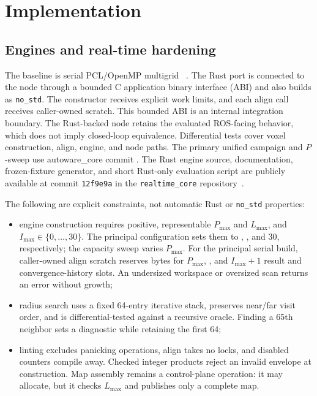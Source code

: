 \section{Implementation}
\label{sec:implementation}

\subsection{Engines and real-time hardening}
The baseline is serial PCL/OpenMP multigrid \ndt{}~\cite{autoware,autowarecore,ndtomp}. The Rust port
is connected to the node through a bounded C application binary interface (ABI) and also
builds as \texttt{no\_std}. The constructor receives explicit work limits, and each align
call receives caller-owned scratch. This bounded ABI is an internal integration boundary.
The Rust-backed node retains the evaluated ROS-facing behavior, which does not imply
closed-loop equivalence. Differential tests cover voxel construction, align,
engine, and node paths. The primary unified campaign and $P$-sweep use
autoware\_core commit \texttt{\envCommit}.
The Rust engine source, documentation, frozen-fixture generator, and short Rust-only
evaluation script are publicly available at commit \texttt{12f9e9a} in the
\texttt{realtime\_core} repository~\cite{tier4realtimecore}.

The following are explicit constraints, not automatic Rust or \texttt{no\_std} properties:
\begin{itemize}
 \item engine construction requires positive, representable $P_{\max}$ and $L_{\max}$,
 and $I_{\max}\in\{0,\ldots,30\}$. The principal configuration sets them to \runtimePMax,
 \runtimeLeavesMax, and 30, respectively; the capacity sweep varies $P_{\max}$. For the
 principal serial build, caller-owned align scratch reserves \runtimeScratchBytes{} bytes
 for $P_{\max}$, \maxnn, and $I_{\max}+1$ result and convergence-history slots. An undersized workspace or oversized scan returns an error without growth;
 \item radius search uses a fixed 64-entry iterative stack, preserves near/far visit order,
 and is differential-tested against a recursive oracle. Finding a 65th neighbor sets a
 diagnostic while retaining the first 64;
 \item linting excludes panicking operations, align takes no locks, and disabled counters
 compile away. Checked integer products reject an invalid envelope at construction. Map
 assembly remains a control-plane operation: it may allocate, but it checks $L_{\max}$ and
 publishes only a complete map.
\end{itemize}

